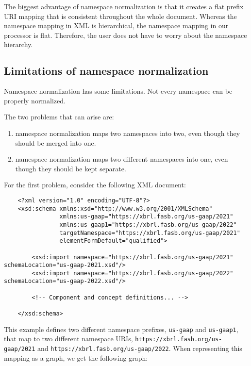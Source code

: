 The biggest advantage of namespace normalization is that it creates a flat prefix URI mapping that is consistent throughout the whole document. 
Whereas the namespace mapping in XML is hierarchical, the namespace mapping in our processor is flat. 
Therefore, the user does not have to worry about the namespace hierarchy.

\subsection{Limitations of namespace normalization}

Namespace normalization has some limitations. Not every namespace can be properly normalized. 

The two problems that can arise are:

\begin{enumerate}
    \item namespace normalization maps two namespaces into two, even though they should be merged into one.
    \item namespace normalization maps two different namespaces into one, even though they should be kept separate.
\end{enumerate}

For the first problem, consider the following XML document:

\begin{lstlisting}
    <?xml version="1.0" encoding="UTF-8"?>
    <xsd:schema xmlns:xsd="http://www.w3.org/2001/XMLSchema"
                xmlns:us-gaap="https://xbrl.fasb.org/us-gaap/2021"
                xmlns:us-gaap1="https://xbrl.fasb.org/us-gaap/2022"
                targetNamespace="https://xbrl.fasb.org/us-gaap/2021"
                elementFormDefault="qualified">

        <xsd:import namespace="https://xbrl.fasb.org/us-gaap/2021" schemaLocation="us-gaap-2021.xsd"/>
        <xsd:import namespace="https://xbrl.fasb.org/us-gaap/2022" schemaLocation="us-gaap-2022.xsd"/>

        <!-- Component and concept definitions... -->

    </xsd:schema>

\end{lstlisting}

This example defines two different namespace prefixes, \texttt{us-gaap} and \texttt{us-gaap1}, that map to two different namespace URIs, \texttt{https://xbrl.fasb.org/us-gaap/2021} and \texttt{https://xbrl.fasb.org/us-gaap/2022}.
When representing this mapping as a graph, we get the following graph:

